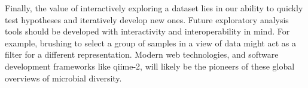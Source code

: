 Finally, the value of interactively exploring a dataset lies in our ability to 
quickly test hypotheses and iteratively develop new ones. Future exploratory 
analysis tools should be developed with interactivity and interoperability in 
mind. For example, brushing to select a group of samples in a view of data 
might act as a filter for a different representation. Modern web technologies, 
and software development frameworks like \gls{qiime}-2, will likely be the 
pioneers of these global overviews of microbial diversity.
